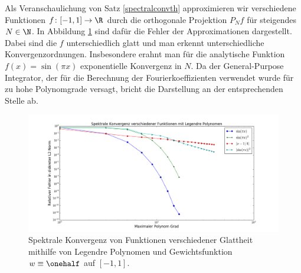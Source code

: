 \begin{mathbsp}
Als Veranschaulichung von Satz \ref{spectralconvth} approximieren wir verschiedene Funktionen $f\colon [-1,1]\to\R$ durch die orthogonale Projektion $P_Nf$ für steigendes $N\in\N$. In Abbildung \ref{figurespectralconverg} sind dafür die Fehler der Approximationen dargestellt. Dabei sind die $f$ unterschiedlich glatt und man erkennt unterschiedliche Konvergenzordnungen. Insbesondere erahnt man für die analytische Funktion $f(x)=\sin(\pi x)$ exponentielle Konvergenz in $N$. Da der General-Purpose Integrator, der für die Berechnung der Fourierkoeffizienten verwendet wurde für zu hohe Polynomgrade versagt, bricht die Darstellung an der entsprechenden Stelle ab.
\begin{figure}[h]
\includegraphics[width=\textwidth]{Figures/spectral_convergence_legendre.png}
\caption{Spektrale Konvergenz von Funktionen verschiedener Glattheit mithilfe von Legendre Polynomen und Gewichtsfunktion $w\equiv \onehalf$ auf $[-1,1]$.}
\label{figurespectralconverg}
\end{figure}
\end{mathbsp}